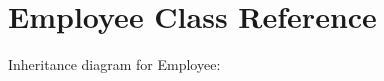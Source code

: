 \hypertarget{classEmployee}{}\section{Employee Class Reference}
\label{classEmployee}


Inheritance diagram for Employee\+:
